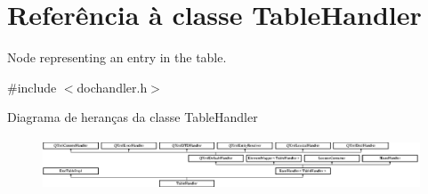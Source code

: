 \hypertarget{class_table_handler}{\section{Referência à classe Table\-Handler}
\label{class_table_handler}
}


Node representing an entry in the table.  




{\ttfamily \#include $<$dochandler.\-h$>$}

Diagrama de heranças da classe Table\-Handler\begin{figure}[H]
\begin{center}
\leavevmode
\includegraphics[height=1.538461cm]{class_table_handler}
\end{center}
\end{figure}
